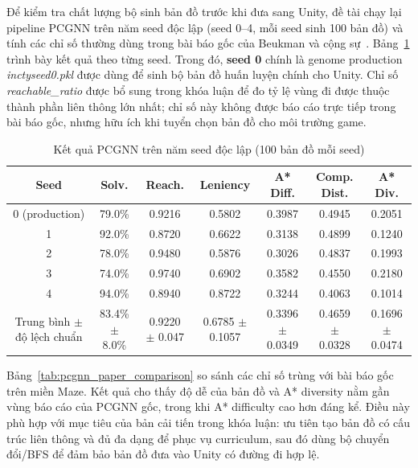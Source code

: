 Để kiểm tra chất lượng bộ sinh bản đồ trước khi đưa sang Unity, đề tài chạy lại pipeline PCGNN trên năm seed độc lập (seed 0--4, mỗi seed sinh 100 bản đồ) và tính các chỉ số thường dùng trong bài báo gốc của Beukman và cộng sự~\cite{Beukman2022}. Bảng~\ref{tab:pcgnn_four_seed_metrics} trình bày kết quả theo từng seed. Trong đó, \textbf{seed 0} chính là genome production \emph{inctyseed0.pkl} được dùng để sinh bộ bản đồ huấn luyện chính cho Unity. Chỉ số \emph{reachable\_ratio} được bổ sung trong khóa luận để đo tỷ lệ vùng đi được thuộc thành phần liên thông lớn nhất; chỉ số này không được báo cáo trực tiếp trong bài báo gốc, nhưng hữu ích khi tuyển chọn bản đồ cho môi trường game.

\begin{table}[H]
    \centering
    \scriptsize
    \setlength{\tabcolsep}{4pt}
    \renewcommand{\arraystretch}{1.15}
    \caption{Kết quả PCGNN trên năm seed độc lập (100 bản đồ mỗi seed)}
    \label{tab:pcgnn_four_seed_metrics}
    \begin{tabular}{c c c c c c c}
        \toprule
        \textbf{Seed} & \textbf{Solv.} & \textbf{Reach.} & \textbf{Leniency} & \textbf{A* Diff.} & \textbf{Comp. Dist.} & \textbf{A* Div.} \\
        \midrule
        0 (production) & 79.0\% & 0.9216 & 0.5802 & 0.3987 & 0.4945 & 0.2051 \\
        1 & 92.0\% & 0.8720 & 0.6622 & 0.3138 & 0.4899 & 0.1240 \\
        2 & 78.0\% & 0.9480 & 0.5876 & 0.3026 & 0.4837 & 0.1993 \\
        3 & 74.0\% & 0.9740 & 0.6902 & 0.3582 & 0.4550 & 0.2180 \\
        4 & 94.0\% & 0.8940 & 0.8722 & 0.3244 & 0.4063 & 0.1014 \\
        \midrule
        Trung bình $\pm$ độ lệch chuẩn & 83.4\% $\pm$ 8.0\% & 0.9220 $\pm$ 0.047 & 0.6785 $\pm$ 0.1057 & 0.3396 $\pm$ 0.0349 & 0.4659 $\pm$ 0.0328 & 0.1696 $\pm$ 0.0474 \\
        \bottomrule
    \end{tabular}
\end{table}

Bảng~\ref{tab:pcgnn_paper_comparison} so sánh các chỉ số trùng với bài báo gốc trên miền Maze. Kết quả cho thấy độ dễ của bản đồ và A* diversity nằm gần vùng báo cáo của PCGNN gốc, trong khi A* difficulty cao hơn đáng kể. Điều này phù hợp với mục tiêu của bản cải tiến trong khóa luận: ưu tiên tạo bản đồ có cấu trúc liên thông và đủ đa dạng để phục vụ curriculum, sau đó dùng bộ chuyển đổi/BFS để đảm bảo bản đồ đưa vào Unity có đường đi hợp lệ.

